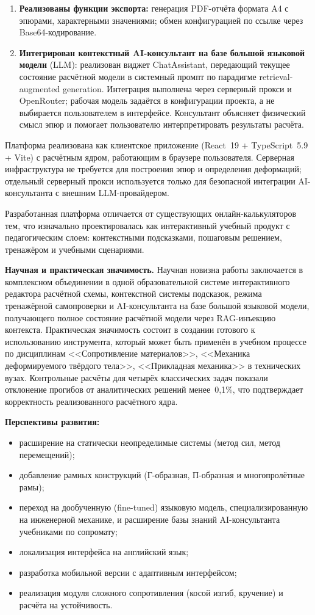 \begin{enumerate}
  \item \textbf{Реализованы функции экспорта:} генерация PDF-отчёта формата A4 с эпюрами, характерными значениями; обмен конфигурацией по ссылке через Base64-кодирование.

  \item \textbf{Интегрирован контекстный AI-консультант на базе большой языковой модели} (LLM): реализован виджет ChatAssistant, передающий текущее состояние расчётной модели в системный промпт по парадигме retrieval-augmented generation. Интеграция выполнена через серверный прокси и OpenRouter; рабочая модель задаётся в конфигурации проекта, а не выбирается пользователем в интерфейсе. Консультант объясняет физический смысл эпюр и помогает пользователю интерпретировать результаты расчёта.
\end{enumerate}

Платформа реализована как клиентское приложение (React~19 + TypeScript~5.9 + Vite) с расчётным ядром, работающим в браузере пользователя. Серверная инфраструктура не требуется для построения эпюр и определения деформаций; отдельный серверный прокси используется только для безопасной интеграции AI-консультанта с внешним LLM-провайдером.

Разработанная платформа отличается от существующих онлайн-калькуляторов тем, что изначально проектировалась как интерактивный учебный продукт с педагогическим слоем: контекстными подсказками, пошаговым решением, тренажёром и учебными сценариями.

\textbf{Научная и практическая значимость.} Научная новизна работы заключается в комплексном объединении в одной образовательной системе интерактивного редактора расчётной схемы, контекстной системы подсказок, режима тренажёрной самопроверки и AI-консультанта на базе большой языковой модели, получающего полное состояние расчётной модели через RAG-инъекцию контекста. Практическая значимость состоит в создании готового к использованию инструмента, который может быть применён в учебном процессе по дисциплинам <<Сопротивление материалов>>, <<Механика деформируемого твёрдого тела>>, <<Прикладная механика>> в технических вузах. Контрольные расчёты для четырёх классических задач показали отклонение прогибов от аналитических решений менее~0{,}1\%, что подтверждает корректность реализованного расчётного ядра.

\textbf{Перспективы развития:}
\begin{itemize}
  \item расширение на статически неопределимые системы (метод сил, метод перемещений);
  \item добавление рамных конструкций (Г-образная, П-образная и многопролётные рамы);
  \item переход на дообученную (fine-tuned) языковую модель, специализированную на инженерной механике, и расширение базы знаний AI-консультанта учебниками по сопромату;
  \item локализация интерфейса на английский язык;
  \item разработка мобильной версии с адаптивным интерфейсом;
  \item реализация модуля сложного сопротивления (косой изгиб, кручение) и расчёта на устойчивость.
\end{itemize}


